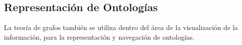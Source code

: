 \subsection{Representación de Ontologías}
La teoría de grafos también se utiliza dentro del área de la visualización de la información, para la representación y navegación de ontologías. 



